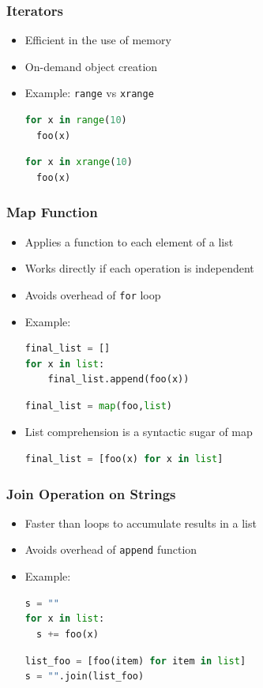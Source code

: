 \documentclass[xcolor=table,10pt,final]{beamer}
\begin{document}
\begin{frame}[fragile]
	\frametitle{Iterators}
	\begin{itemize}
		\item Efficient in the use of memory
		\item On-demand object creation
		\item Example: {\tt range} vs {\tt xrange}
			\begin{lstlisting}[language=Python]
for x in range(10)
  foo(x)
			\end{lstlisting}
			\begin{lstlisting}[language=Python]
for x in xrange(10)
  foo(x)
			\end{lstlisting}
	\end{itemize}
\end{frame}

\begin{frame}[fragile]
	\frametitle{Map Function}
	\begin{itemize}
		\item Applies a function to each element of a list
		\item Works directly if each operation is independent
		\item Avoids overhead of {\tt for} loop
		\item Example:
			\begin{lstlisting}[language=Python]
final_list = []
for x in list:
    final_list.append(foo(x))
			\end{lstlisting}
			\begin{lstlisting}[language=Python]
final_list = map(foo,list)
			\end{lstlisting}
		\item List comprehension is a syntactic sugar of map
			\begin{lstlisting}[language=Python]
final_list = [foo(x) for x in list]
			\end{lstlisting}
	\end{itemize}
\end{frame}

\begin{frame}[fragile]
	\frametitle{Join Operation on Strings}
	\begin{itemize}
		\item Faster than loops to accumulate results in a list
		\item Avoids overhead of {\tt append} function
		\item Example:
			\begin{lstlisting}[language=Python]
s = ""
for x in list:
  s += foo(x)
			\end{lstlisting}
			\begin{lstlisting}[language=Python]
list_foo = [foo(item) for item in list]
s = "".join(list_foo)
			\end{lstlisting}
	\end{itemize}
\end{frame}
\end{document}
